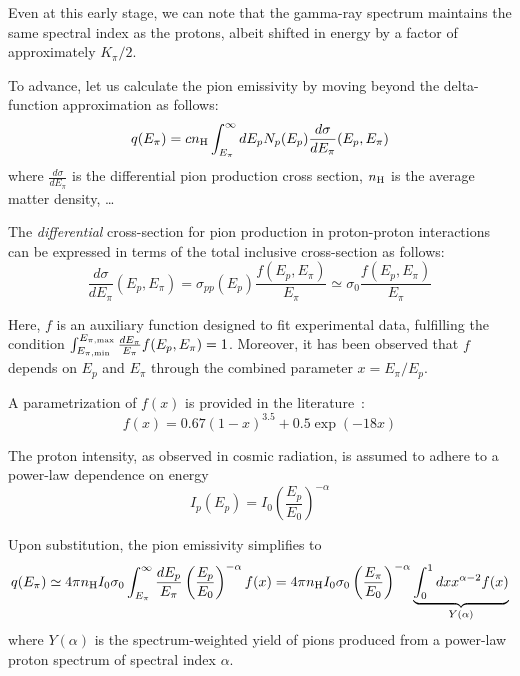 Even at this early stage, we can note that the gamma-ray spectrum maintains the same spectral index as the protons, albeit shifted in energy by a factor of approximately \( K_\pi / 2 \).

To advance,  let us calculate the pion emissivity by moving beyond the delta-function approximation as follows:
%
\begin{equation}
q(E_\pi) = c n_{\rm H} \int_{E_\pi}^\infty dE_p N_p (E_p) \frac{d\sigma}{dE_\pi}(E_p, E_\pi)
\end{equation}
%
where $\frac{d\sigma}{dE_\pi}$ is the differential pion production cross section, $n_{\rm H}$ is the average matter density, \dots

The \emph{differential} cross-section for pion production in proton-proton interactions can be expressed in terms of the total inclusive cross-section as follows:
%
\begin{equation}
\frac{d\sigma}{dE_\pi}(E_p, E_\pi) = \sigma_{pp}(E_p) \frac{f(E_p, E_\pi)}{E_\pi} \simeq \sigma_{0} \frac{f(E_p, E_\pi)}{E_\pi} 
\end{equation}

Here, \(f\) is an auxiliary function designed to fit experimental data, fulfilling the condition $\int_{E_{\rm \pi,min}}^{E_{\rm \pi,max}} \frac{dE_\pi}{E_\pi} f(E_p, E_\pi) = 1$. 
%
Moreover, it has been observed that $f$ depends on \(E_p\) and \(E_\pi\) through the combined parameter \(x = E_\pi / E_p\). 

A parametrization of \(f(x)\) is provided in the literature~\cite{Cavasinni2006aph}:
%
\begin{equation}
f(x) = 0.67 (1-x)^{3.5} + 0.5 \exp(-18 x)
\end{equation}

The proton intensity, as observed in cosmic radiation, is assumed to adhere to a power-law dependence on energy
%
\begin{equation}
I_p(E_p) = I_0 \left(\frac{E_p}{E_0}\right)^{-\alpha}
\end{equation}

Upon substitution, the pion emissivity simplifies to
%
\begin{equation}
q(E_\pi) \simeq 4 \pi n_{\rm H} I_0 \sigma_0 \int_{E_\pi}^\infty \frac{dE_p}{E_\pi} \left(\frac{E_p}{E_0} \right)^{-\alpha} f(x) = 4 \pi n_{\rm H} I_0 \sigma_0 \left(\frac{E_\pi}{E_0} \right)^{-\alpha} \underbrace{ \int_0^1 dx x^{\alpha-2} f(x)}_{Y(\alpha)}
\end{equation}
%
where $Y(\alpha)$ is the spectrum-weighted yield of pions produced from a power-law proton spectrum of spectral index $\alpha$.

